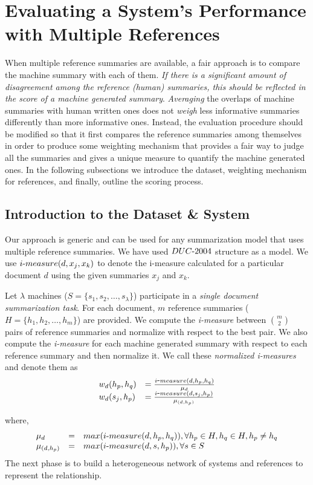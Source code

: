 \documentclass[a4paper]{report}
\begin{document}
\section{Evaluating a System's Performance with Multiple References}
\label{eval}
When multiple reference summaries are available, a fair approach is to compare the machine summary with each of them. \emph{If there is a significant amount of disagreement among the reference (human) summaries, this should be reflected in the score of a machine generated summary}. \emph{Averaging} the overlaps of machine summaries with human written ones does not \emph{weigh} less informative summaries differently than more informative ones. Instead, the evaluation procedure should be modified so that it first compares the reference summaries among themselves in order to produce some weighting mechanism that provides a fair way to judge all the summaries and gives a unique measure to quantify the machine generated ones. In the following subsections we introduce the dataset, weighting mechanism for references, and finally, outline the scoring process.
\vspace{-.5 cm}
\subsection{Introduction to the Dataset \& System}
\vspace{-0.2cm}
Our approach is generic and can be used for any summarization model that uses multiple reference summaries. We have used $DUC\hbox{-}2004$ structure as a model. We use $i\hbox{-}measure(d,x_j,x_k)$ to denote the i-measure calculated for a particular document $d$ using the given summaries $x_j$ and $x_k$.
\par Let $\lambda$ machines ($S = \{s_1, s_2,\dots,s_\lambda\}$) participate in a \emph{single document summarization task}. For each document, $m$ reference summaries ($H = \{h_1,h_2,\dots,h_m\}$) are provided.  We compute the \emph{i-measure} between $\binom{m}{2}$ pairs of reference summaries and normalize with respect to the best pair. We also compute the \emph{i-measure} for each machine generated summary with respect to each reference summary and then normalize it.  We call these \emph{normalized i-measures} and denote them as
\begin{equation}
\label{system_model_weight}
\begin{array}{ll}
w_d(h_p,h_q) & = \frac{i\hbox{-}measure(d,h_p,h_q)}{\mu_d} \\
w_d(s_j,h_p) & = \frac{i\hbox{-}measure(d,s_j,h_p)}{\mu_{(d,h_p)}}
\end{array}
\end{equation}
\par where,
\small
\begin{equation*}
\begin{array}{lcl}
 \mu_d &=& max(i\hbox{-}measure(d,h_p,h_q)), \forall h_p \in H, h_q \in H, h_p \ne h_q \\
 \mu_{(d,h_p)} &=& max(i\hbox{-}measure(d,s,h_p)), \forall s \in S\\
\end{array}
\end{equation*}
The next phase is to build a heterogeneous network of systems and references to represent the relationship.
\end{document}
